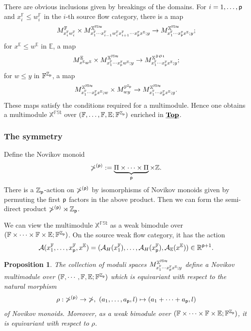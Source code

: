 \documentclass[reqno, 10pt]{amsart}
\numberwithin{equation}{section}
\numberwithin{equation}{section}
\newtheorem{prop}[thm]{Proposition}
\theoremstyle{definition}
\theoremstyle{remark}
\newcommand{\beqn}{\begin{equation*}}
\newcommand{\eeqn}{\end{equation*}}
\newcommand{\mb}{\mathbb}
\newcommand{\mc}{\mathcal}
\newcommand{\mf}{\mathfrak}
\newcommand{\p}{{\sf p}}
\newcommand{\zp}{{{\mb Z}_{\sf p}}}
\newcommand{\ep}{{{\mathbb E}}}
\newcommand{\uds}[1]{\underline{\smash{#1}}}
\begin{document}
There are obvious inclusions given by breakings of the domains. For $i = 1, \ldots, \p$  and $x_i^{{\mb F}} \leq w_i^{{\mb F}}$ in the $i$-th source flow category, there is a map 
\beqn
M_{x_i^{\mb F} w_i^{\mb F}}^{{\mb F}} \times M_{x_1^{\mb F} \cdots x_{i-1}^{\mb F} w_i^{\mb F} x_{i+1}^{\mb F} \cdots x_\p^{\mb F} x^{\ep}; y}^{\mb{X}^{\mb{FSt}}} \to M_{x_1^{\mb F} \cdots x_\p^{\mb F} x^\ep; y}^{\mb{X}^{\mb{FSt}}};
\eeqn
for $x^\ep \leq w^\ep$ in $\ep$, a map
\beqn
M_{x^\ep w^\ep}^\ep \times M_{x_1^{\mb F} \cdots x_\p^{\mb{F}} w^\ep; y}^{{\mb X}^{\mb{FSt}}} \to M_{x_1^{\mb F} \cdots x_\p^{\mb F} x^\ep; y}^{\mb{X}^{\mf{FSt}}};
\eeqn
for $w \leq y$ in $\mb{F}^{\zp}$, a map
\beqn
M_{x_1^{\mb F} \cdots x_\p^{\mb F} x^\ep; w}^{\mb{X}^{\mb{FSt}}} \times M_{wy}^{\mb{F}^\zp} \to M_{x_1^{\mb F}\cdots x_\p^{\mb F} x^\ep; y}^{\mb{X}^{\mb{FSt}}}.
\eeqn
These maps satisfy the conditions required for a multimodule. Hence one obtains a multimodule ${\mb X}^{\mb{FSt}}$ over $(\mb{F}, \ldots, {\mb F}, \ep; {\mb F}^\zp)$ enriched in $\uds{\bf Top}$.





\subsubsection{The symmetry}

Define the Novikov monoid
\beqn
\mb\Pi^{(\p)}:= \underbrace{\Pi \times \cdots \times \Pi}_{\p} \times {\mb Z}.
\eeqn
There is a $\zp$-action on $\mb\Pi^{(\p)}$ by isomorphisms of Novikov monoids given by permuting the first $\p$ factors in the above product. Then we can form the semi-direct product $\mb\Pi^{(\p)}\rtimes \zp$. 

We can view the multimodule ${\mb X}^{\mb{FSt}}$ as a weak bimodule over $({\mb F}\times \cdots \times {\mb F} \times \ep; {\mb F}^\zp)$. On the source weak flow category, it has the action 
\beqn
{\mc A}(x_1^{\mb F}, \ldots, x^{\mb F}_\p, x^{\ep}) = ({\mc A}_H(x_1^{\mb F}), \ldots, {\mc A}_H(x_\p^{\mb F}), {\mc A}_{\ep}(x^\ep)) \in {\mb R}^{\p + 1}.
\eeqn





\begin{prop}
The collection of moduli spaces $M_{x_1^{\mb F} \cdots x_\p^{\mb F} x^\ep; y}^{{\mb X}^{\mb{FSt}}}$ define a Novikov multimodule over $({\mb F}, \cdots, {\mb F}, \ep; {\mb F}^\zp)$ which is equivariant with respect to the natural morphism
\beqn
\rho: \mb\Pi^{(\p)} \to \mb\Pi,\ (a_1, \ldots, a_\p, l) \mapsto (a_1 + \cdots + a_\p, l)
\eeqn
of Novikov monoids. Moreover, as a weak bimodule over $({\mb F}\times \cdots \times {\mb F} \times \ep; {\mb F}^\zp)$, it is equivariant with respect to $\rho$.
\end{prop}
\end{document}
